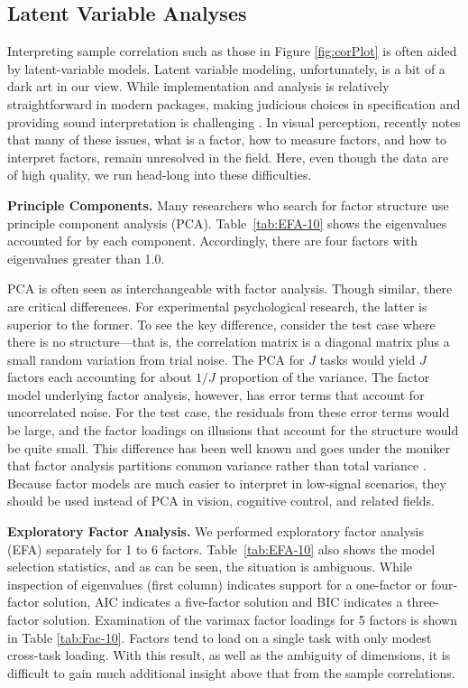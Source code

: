 \documentclass[man, 12pt]{apa7} %
\begin{document}
\subsection{Latent Variable Analyses}

Interpreting sample correlation such as those in Figure \ref{fig:corPlot} is often aided by latent-variable models.   Latent variable modeling, unfortunately, is a bit of a dark art in our view.  While implementation and analysis is relatively straightforward in modern packages, making judicious choices in specification and providing sound interpretation is challenging \parencite[]{Preacher.MacCallum.2003, Armstrong.1967}.  In visual perception, \textcite{Tulver.2019} recently notes that many of these issues, what is a factor, how to measure factors, and how to interpret factors, remain unresolved in the field.  Here, even though the data are of high quality, we run head-long into these difficulties. 



\textbf{Principle Components.}  Many researchers who search for factor structure use principle component analysis (PCA).   Table~\ref{tab:EFA-10} shows the eigenvalues accounted for by each component. Accordingly, there are four factors with eigenvalues greater than 1.0. 

PCA is often seen as interchangeable with factor analysis.  Though similar, there are critical differences.  For experimental psychological research, the latter is superior to the former.  To see the key difference, consider the test case where there is no structure---that is, the correlation matrix is a diagonal matrix plus a small random variation from trial noise.  The PCA for $J$ tasks would yield $J$ factors each accounting for about $1/J$ proportion of the variance.   The factor model underlying factor analysis, however, has error terms that account for uncorrelated noise.  For the test case, the residuals from these error terms would be large, and the factor loadings on illusions that account for the structure would be quite small.  This difference has been well known \parencite[]{Velicer.Jackson.1990} and goes under the moniker that factor analysis partitions common variance rather than total variance \parencite[]{Kline.2023}.  Because factor models are much easier to interpret in low-signal scenarios, they should be used instead of PCA in vision, cognitive control, and related fields.

{\bf Exploratory Factor Analysis.}  We performed exploratory factor analysis (EFA) separately for 1 to 6 factors.  Table~\ref{tab:EFA-10} also shows the model selection statistics, and as can be seen, the situation is ambiguous.  While inspection of eigenvalues (first column) indicates support for a one-factor or four-factor solution, AIC indicates a five-factor solution and BIC indicates a three-factor solution.  Examination of the varimax factor loadings for 5 factors is shown in Table \ref{tab:Fac-10}. Factors tend to load on a single task with only modest cross-task loading.  With this result, as well as the ambiguity of dimensions, it is difficult to gain much additional insight above that from the sample correlations.  
\end{document}
